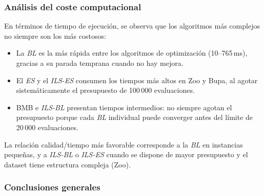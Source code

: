 \documentclass[12pt]{article}
\begin{document}
\subsubsection*{Análisis del coste computacional}
 
En términos de tiempo de ejecución, se observa que los algoritmos más complejos no
siempre son los más costosos:
 
\begin{itemize}
    \item La \textit{BL} es la más rápida entre los algoritmos de optimización (10--765\,ms),
    gracias a su parada temprana cuando no hay mejora.
    \item El \textit{ES} y el \textit{ILS-ES} consumen los tiempos más altos en Zoo y Bupa, al agotar
    sistemáticamente el presupuesto de 100\,000 evaluaciones.
    \item BMB e \textit{ILS-BL} presentan tiempos intermedios: no siempre agotan el presupuesto
    porque cada \textit{BL} individual puede converger antes del límite de 20\,000 evaluaciones.
\end{itemize}
 
\noindent La relación calidad/tiempo más favorable corresponde a la \textit{BL} en instancias
pequeñas, y a \textit{ILS-BL} o \textit{ILS-ES} cuando se dispone de mayor presupuesto y el dataset tiene
estructura compleja (Zoo).
 
\subsubsection*{Conclusiones generales}
 
\end{document}

